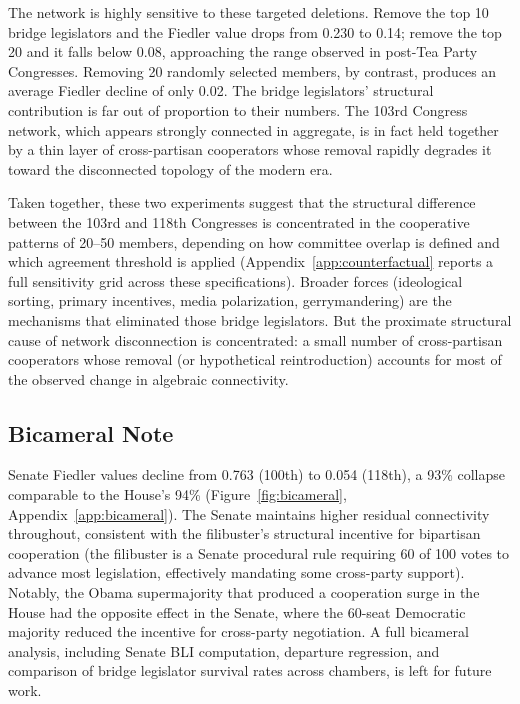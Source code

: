 \documentclass[12pt, a4paper]{article}
\begin{document}
The network is highly sensitive to these targeted deletions. Remove the top 10 bridge legislators and the Fiedler value drops from 0.230 to 0.14; remove the top 20 and it falls below 0.08, approaching the range observed in post-Tea Party Congresses. Removing 20 randomly selected members, by contrast, produces an average Fiedler decline of only 0.02. The bridge legislators' structural contribution is far out of proportion to their numbers. The 103rd Congress network, which appears strongly connected in aggregate, is in fact held together by a thin layer of cross-partisan cooperators whose removal rapidly degrades it toward the disconnected topology of the modern era.

Taken together, these two experiments suggest that the structural difference between the 103rd and 118th Congresses is concentrated in the cooperative patterns of 20--50 members, depending on how committee overlap is defined and which agreement threshold is applied (Appendix~\ref{app:counterfactual} reports a full sensitivity grid across these specifications). Broader forces (ideological sorting, primary incentives, media polarization, gerrymandering) are the mechanisms that eliminated those bridge legislators. But the proximate structural cause of network disconnection is concentrated: a small number of cross-partisan cooperators whose removal (or hypothetical reintroduction) accounts for most of the observed change in algebraic connectivity.

\subsection*{Bicameral Note}

Senate Fiedler values decline from 0.763 (100th) to 0.054 (118th), a 93\% collapse comparable to the House's 94\% (Figure~\ref{fig:bicameral}, Appendix~\ref{app:bicameral}). The Senate maintains higher residual connectivity throughout, consistent with the filibuster's structural incentive for bipartisan cooperation (the filibuster is a Senate procedural rule requiring 60 of 100 votes to advance most legislation, effectively mandating some cross-party support). Notably, the Obama supermajority that produced a cooperation surge in the House had the opposite effect in the Senate, where the 60-seat Democratic majority reduced the incentive for cross-party negotiation. A full bicameral analysis, including Senate BLI computation, departure regression, and comparison of bridge legislator survival rates across chambers, is left for future work.
\end{document}
